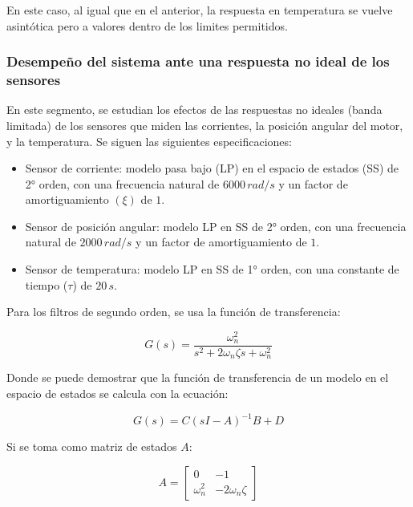 \documentclass{article}
\begin{document}
En este caso, al igual que en el anterior, la respuesta en temperatura se vuelve asintótica pero 
a valores dentro de los limites permitidos.


\subsubsection{Desempeño del sistema ante una respuesta no ideal de los sensores}

En este segmento, se estudian los efectos de las respuestas no ideales (banda limitada) de los 
sensores que miden las corrientes, la posición angular del motor, y la temperatura. Se siguen las 
siguientes especificaciones:

\begin{itemize}
    \item Sensor de corriente: modelo pasa bajo (LP) en el espacio de estados (SS) de 2° orden, 
    con una frecuencia natural de $6000\,rad/s$ y un factor de amortiguamiento $(\xi)$ de $1$.

    \item Sensor de posición angular: modelo LP en SS de 2° orden, con una frecuencia natural de 
    $2000\,rad/s$ y un factor de amortiguamiento de $1$.

    \item Sensor de temperatura: modelo LP en SS de 1° orden, con una constante de tiempo ($\tau$)  
    de $20\,s$.
\end{itemize}

Para los filtros de segundo orden, se usa la función de transferencia:

\begin{equation}
    G(s) = \frac{\omega_n^2}{s^2 + 2\omega_n\zeta s + \omega_n^2}
\end{equation}

Donde se puede demostrar que la función de transferencia de un modelo en el espacio de estados se 
calcula con la ecuación:

\begin{equation}
    G(s) = C(sI - A)^{-1}B + D
\end{equation}

Si se toma como matriz de estados $A$:

\[
A = \begin{bmatrix}
0 & -1 \\
\omega_n^2 & -2\omega_n\zeta
\end{bmatrix}
\]
\end{document}
